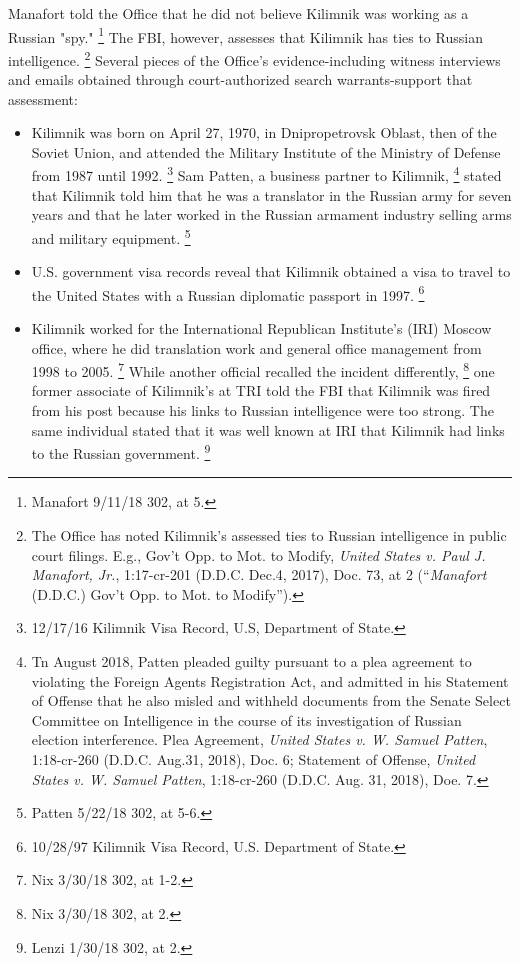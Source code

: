 Manafort told the Office that he did not believe Kilimnik was working as a Russian "spy."%
\footnote{Manafort 9/11/18 302, at 5.}
The FBI, however, assesses that Kilimnik has ties to Russian intelligence.%
\footnote{The Office has noted Kilimnik’s assessed ties to Russian intelligence in public court filings.
E.g., Gov’t Opp. to Mot. to Modify, \textit{United States v. Paul J. Manafort, Jr.}, 1:17-cr-201 (D.D.C. Dec.4, 2017), Doc. 73, at 2 (“\textit{Manafort} (D.D.C.) Gov’t Opp. to Mot. to Modify”).}
Several pieces of the Office's evidence-including witness interviews and emails obtained through court-authorized search warrants-support that assessment:

\begin{itemize}

    \item Kilimnik was born on April 27, 1970, in Dnipropetrovsk Oblast, then of the Soviet Union, and attended the Military Institute of the Ministry of Defense from 1987 until 1992.%
\footnote{12/17/16 Kilimnik Visa Record, U.S, Department of State.}
    Sam Patten, a business partner to Kilimnik,%
\footnote{Tn August 2018, Patten pleaded guilty pursuant to a plea agreement to violating the Foreign Agents Registration Act, and admitted in his Statement of Offense that he also misled and withheld documents from the Senate Select Committee on Intelligence in the course of its investigation of Russian election interference.
Plea Agreement, \textit{United States v. W. Samuel Patten}, 1:18-cr-260 (D.D.C. Aug.31, 2018), Doc. 6;
Statement of Offense, \textit{United States v. W. Samuel Patten}, 1:18-cr-260 (D.D.C. Aug. 31, 2018), Doe. 7.}
    stated that Kilimnik told him that he was a translator in the Russian army for seven years and that he later worked in the Russian armament industry selling arms and military equipment.%
\footnote{Patten 5/22/18 302, at 5-6.}

    \item U.S. government visa records reveal that Kilimnik obtained a visa to travel to the United States with a Russian diplomatic passport in 1997.%
\footnote{10/28/97 Kilimnik Visa Record, U.S. Department of State.}

    \item Kilimnik worked for the International Republican Institute's (IRI) Moscow office, where he did translation work and general office management from 1998 to 2005.%
\footnote{Nix 3/30/18 302, at 1-2.}
    While another official recalled the incident differently,%
\footnote{Nix 3/30/18 302, at 2.}
    one former associate of Kilimnik's at TRI told the FBI that Kilimnik was fired from his post because his links to Russian intelligence were too strong.
    The same individual stated that it was well known at IRI that Kilimnik had links to the Russian government.%
\footnote{Lenzi 1/30/18 302, at 2.}


\end{itemize}
